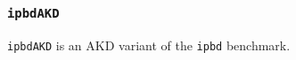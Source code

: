 \subsubsection{\tt ipbdAKD}
\label{benchmarkipbdAKD}

{\tt ipbdAKD} is an AKD variant of the {\tt ipbd} benchmark.
